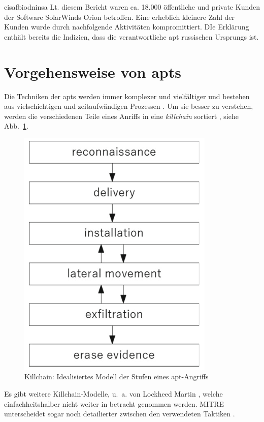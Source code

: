 \documentclass[conference]{IEEEtran}
\begin{document}
\ac{cisa}\ac{fbi}\ac{odni}\ac{nsa}
Lt. diesem Bericht waren ca. 18.000 öffentliche und private Kunden der Software SolarWinds Orion betroffen.
Eine erheblich kleinere Zahl der Kunden wurde durch nachfolgende Aktivitäten kompromittiert.
DIe Erklärung enthält bereits die Indizien, dass die verantwortliche \ac{apt} russischen Ursprungs ist.

\section{Vorgehensweise von \aclp{apt}}

Die Techniken der \acp{apt} werden immer komplexer und vielfältiger und bestehen aus vielschichtigen und zeitaufwändigen Prozessen \cite[S.~7f]{Steffens2020}.
Um sie besser zu verstehen, werden die verschiedenen Teile eines Anriffs in eine \textit{killchain} sortiert \cite[S.~8]{Steffens2020}, siehe Abb.~\ref{fig.killchain}.
\begin{figure}[htbp]
    \centerline{\includegraphics[scale=0.8]{figures/killchain.png}}
    \caption{Killchain: Idealisiertes Modell der Stufen eines \ac{apt}-Angriffs \cite[S.~8]{Steffens2020}}
    \label{fig.killchain}
\end{figure}
Es gibt weitere Killchain-Modelle, u.~a. von Lockheed Martin \cite{LockheedMartin}, welche einfachheitshalber nicht weiter in betracht genommen werden.
MITRE unterscheidet sogar noch detailierter zwischen den verwendeten Taktiken \cite{MITREEnterpriseTactics}.
\end{document}
